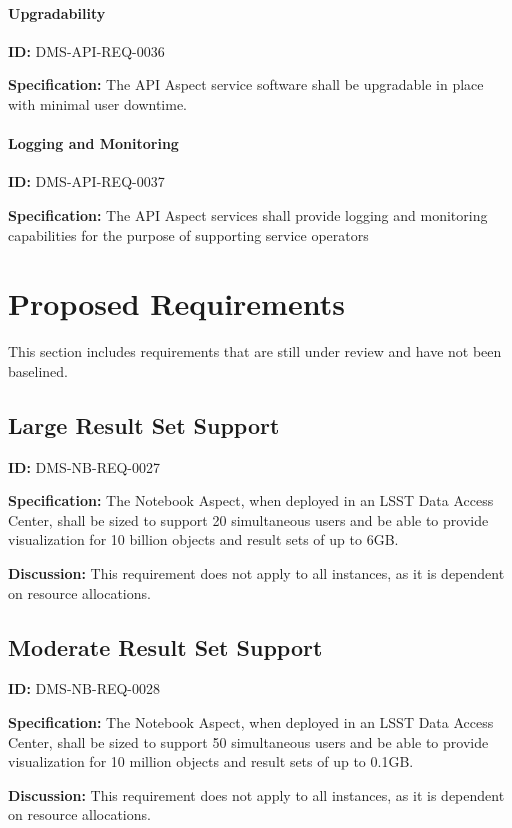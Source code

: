 \documentclass[SE,toc]{lsstdoc}
\newcommand{\addendum}{}
\begin{document}
\paragraph{Upgradability}\hfill  %

\label{DMS-API-REQ-0036}
\textbf{ID:} DMS-API-REQ-0036

\textbf{Specification:}
The API Aspect service software shall be upgradable in place with minimal user downtime.

\paragraph{Logging and Monitoring}\hfill  %

\label{DMS-API-REQ-0037}
\textbf{ID:} DMS-API-REQ-0037

\textbf{Specification:}
The API Aspect services shall provide logging and monitoring capabilities for the purpose of supporting service operators

\section{Proposed Requirements}

This section includes requirements that are still under review and have not been baselined.

\subsection{Large Result Set Support}

\label{DMS-NB-REQ-0027}
\textbf{ID:} DMS-NB-REQ-0027

\textbf{Specification:}
The Notebook Aspect, when deployed in an LSST Data Access Center, shall be sized to support 20 simultaneous users and be able to provide visualization for 10 billion objects and result sets of up to 6GB.

\textbf{Discussion:}
This requirement does not apply to all instances, as it is dependent on resource allocations.

\subsection{Moderate Result Set Support}

\label{DMS-NB-REQ-0028}
\textbf{ID:} DMS-NB-REQ-0028

\textbf{Specification:}
The Notebook Aspect, when deployed in an LSST Data Access Center, shall be sized to support 50 simultaneous users and be able to provide visualization for 10 million objects and result sets of up to 0.1GB.

\textbf{Discussion:}
This requirement does not apply to all instances, as it is dependent on resource allocations.

\addendum


\end{document}
